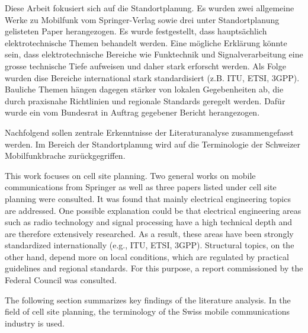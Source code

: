 \begin{German}
    Diese Arbeit fokusiert sich auf die Standortplanung. Es wurden zwei allgemeine Werke zu Mobilfunk vom Springer-Verlag \cite{behnkeGrundkursMobilfunkUnd2022,jiangCellularCommunicationNetworks2024} sowie drei unter Standortplanung gelisteten Paper \cite{engelsDimensioningCellSite2013,ahamed5GNetworkCoverage2021,huangAutomaticCellPlanning2000} herangezogen. Es wurde festgestellt, dass hauptsächlich elektrotechnische Themen behandelt werden. Eine mögliche Erklärung könnte sein, dass elektrotechnische Bereiche wie Funktechnik und Signalverarbeitung eine grosse technische Tiefe aufweisen und daher stark erforscht werden. Als Folge wurden dise Bereiche international stark standardisiert (z.B. ITU, ETSI, 3GPP). Bauliche Themen hängen dagegen stärker von lokalen Gegebenheiten ab, die durch praxisnahe Richtlinien und regionale Standards geregelt werden. Dafür wurde ein vom Bundesrat in Auftrag gegebener Bericht \cite{bundesratNachhaltigesMobilfunknetzBericht2022} herangezogen.

    Nachfolgend sollen zentrale Erkenntnisse der Literaturanalyse zusammengefasst werden. Im Bereich der Standortplanung wird auf die Terminologie der Schweizer Mobilfunkbrache zurückgegriffen.
\end{German}

\begin{English}
    This work focuses on cell site planning. Two general works on mobile communications from Springer \cite{behnkeGrundkursMobilfunkUnd2022,jiangCellularCommunicationNetworks2024} as well as three papers listed under cell site planning \cite{engelsDimensioningCellSite2013,ahamed5GNetworkCoverage2021,huangAutomaticCellPlanning2000} were consulted. It was found that mainly electrical engineering topics are addressed. One possible explanation could be that electrical engineering areas such as radio technology and signal processing have a high technical depth and are therefore extensively researched. As a result, these areas have been strongly standardized internationally (e.g., ITU, ETSI, 3GPP). Structural topics, on the other hand, depend more on local conditions, which are regulated by practical guidelines and regional standards. For this purpose, a report \cite{bundesratNachhaltigesMobilfunknetzBericht2022} commissioned by the Federal Council was consulted.

    The following section summarizes key findings of the literature analysis. In the field of cell site planning, the terminology of the Swiss mobile communications industry is used.
\end{English}


